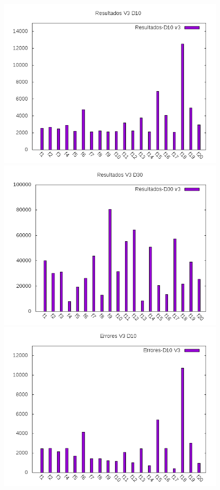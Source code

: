 \documentclass[12pt,a4paper]{article}
\begin{document}
	\begin{figure}[!h]
		\includegraphics[scale=0.5]{../Algoritmo/resultados/Imagenes/Resultados/resultados_v3_d10.png}
		\includegraphics[scale=0.5]{../Algoritmo/resultados/Imagenes/Resultados/resultados_v3_d30.png}
		\includegraphics[scale=0.5]{../Algoritmo/resultados/Imagenes/Errores/errores_v3_d10.png}

\end{figure}
\end{document}
